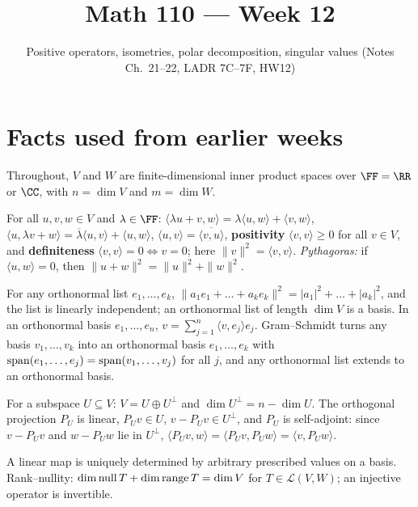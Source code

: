 \documentclass[10pt]{scrartcl}
\title{Math 110 --- Week 12}
\subtitle{Positive operators, isometries, polar decomposition, singular values (Notes Ch.~21--22, LADR 7C--7F, HW12)}
\author{}\date{}\ihead{}
\newcommand{\LL}{\mathcal L}\newcommand{\PP}{\mathcal P}\newcommand{\MM}{\mathcal M}
\begin{document}
\maketitle

\section{Facts used from earlier weeks}

Throughout, $V$ and $W$ are finite-dimensional inner product spaces over $\FF=\RR$ or $\CC$, with $n=\dim V$ and $m=\dim W$.

\begin{enumerate}[label=(T\arabic*),leftmargin=2.6em,itemsep=8pt]
  \ii {} For all $u,v,w\in V$ and $\lambda\in\FF$: $\langle\lambda u+v,w\rangle=\lambda\langle u,w\rangle+\langle v,w\rangle$, $\langle u,\lambda v+w\rangle=\overline{\lambda}\langle u,v\rangle+\langle u,w\rangle$, $\langle u,v\rangle=\overline{\langle v,u\rangle}$, \textbf{positivity} $\langle v,v\rangle\ge0$ for all $v\in V$, and \textbf{definiteness} $\langle v,v\rangle=0 \iff v=0$; here $\|v\|^2=\langle v,v\rangle$. \textit{Pythagoras:} if $\langle u,w\rangle=0$, then $\|u+w\|^2=\|u\|^2+\|w\|^2$.

  \ii {} For any orthonormal list $e_1,\dots,e_k$, $\|a_1e_1+\dots+a_ke_k\|^2=|a_1|^2+\dots+|a_k|^2$, and the list is linearly independent; an orthonormal list of length $\dim V$ is a basis. In an orthonormal basis $e_1,\dots,e_n$, $v=\sum_{j=1}^n\langle v,e_j\rangle e_j$. Gram--Schmidt turns any basis $v_1,\dots,v_k$ into an orthonormal basis $e_1,\dots,e_k$ with $\operatorname{span}(e_1,\dots,e_j)=\operatorname{span}(v_1,\dots,v_j)$ for all $j$, and any orthonormal list extends to an orthonormal basis.

  \ii {} For a subspace $U\subseteq V$: $V=U\oplus U^\perp$ and $\dim U^\perp = n-\dim U$. The orthogonal projection $P_U$ is linear, $P_Uv\in U$, $v-P_Uv\in U^\perp$, and $P_U$ is self-adjoint: since $v-P_Uv$ and $w-P_Uw$ lie in $U^\perp$, $\langle P_Uv,w\rangle=\langle P_Uv,P_Uw\rangle=\langle v,P_Uw\rangle$.

  \ii {} A linear map is uniquely determined by arbitrary prescribed values on a basis. Rank--nullity: $\dim\operatorname{null} T+\dim\operatorname{range} T=\dim V$ for $T\in\LL(V,W)$; an injective operator is invertible.


\end{enumerate}
\end{document}
